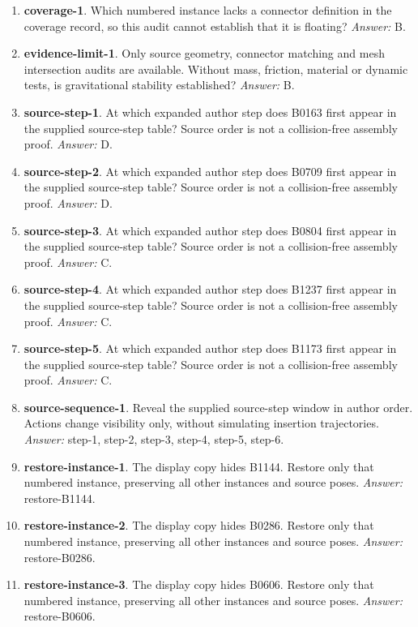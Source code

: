 \begin{enumerate}
\item \textbf{coverage-1}. Which numbered instance lacks a connector definition in the coverage record, so this audit cannot establish that it is floating? \textit{Answer:} B.
\item \textbf{evidence-limit-1}. Only source geometry, connector matching and mesh intersection audits are available. Without mass, friction, material or dynamic tests, is gravitational stability established? \textit{Answer:} B.
\item \textbf{source-step-1}. At which expanded author step does B0163 first appear in the supplied source-step table? Source order is not a collision-free assembly proof. \textit{Answer:} D.
\item \textbf{source-step-2}. At which expanded author step does B0709 first appear in the supplied source-step table? Source order is not a collision-free assembly proof. \textit{Answer:} D.
\item \textbf{source-step-3}. At which expanded author step does B0804 first appear in the supplied source-step table? Source order is not a collision-free assembly proof. \textit{Answer:} C.
\item \textbf{source-step-4}. At which expanded author step does B1237 first appear in the supplied source-step table? Source order is not a collision-free assembly proof. \textit{Answer:} C.
\item \textbf{source-step-5}. At which expanded author step does B1173 first appear in the supplied source-step table? Source order is not a collision-free assembly proof. \textit{Answer:} C.
\item \textbf{source-sequence-1}. Reveal the supplied source-step window in author order. Actions change visibility only, without simulating insertion trajectories. \textit{Answer:} step-1, step-2, step-3, step-4, step-5, step-6.
\item \textbf{restore-instance-1}. The display copy hides B1144. Restore only that numbered instance, preserving all other instances and source poses. \textit{Answer:} restore-B1144.
\item \textbf{restore-instance-2}. The display copy hides B0286. Restore only that numbered instance, preserving all other instances and source poses. \textit{Answer:} restore-B0286.
\item \textbf{restore-instance-3}. The display copy hides B0606. Restore only that numbered instance, preserving all other instances and source poses. \textit{Answer:} restore-B0606.
\end{enumerate}
\clearpage
